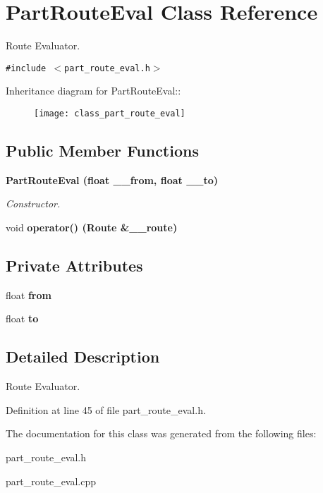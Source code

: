 \section{Part\-Route\-Eval Class Reference}
\label{class_part_route_eval}
Route Evaluator.  


{\tt \#include $<$part\_\-route\_\-eval.h$>$}

Inheritance diagram for Part\-Route\-Eval::\begin{figure}[H]
\begin{center}
\leavevmode
\texttt{[image: class\_part\_route\_eval]}
\end{center}
\end{figure}
\subsection*{Public Member Functions}
\begin{CompactItemize}
\item 
\bf{Part\-Route\-Eval} (float \_\-\_\-from, float \_\-\_\-to)\label{class_part_route_eval_a331566b29bc3227f377004232f05491}

\begin{CompactList}\small\item\em Constructor. \item\end{CompactList}\item 
void \bf{operator()} (\bf{Route} \&\_\-\_\-route)\label{class_part_route_eval_965fab875fb601f17934a6ece761beae}

\end{CompactItemize}
\subsection*{Private Attributes}
\begin{CompactItemize}
\item 
float \bf{from}\label{class_part_route_eval_5bde722e66378b2570ae6c4b4f8df58e}

\item 
float \bf{to}\label{class_part_route_eval_de53cc919faa498663f327b72c357da3}

\end{CompactItemize}


\subsection{Detailed Description}
Route Evaluator. 



Definition at line 45 of file part\_\-route\_\-eval.h.

The documentation for this class was generated from the following files:\begin{CompactItemize}
\item 
part\_\-route\_\-eval.h\item 
part\_\-route\_\-eval.cpp\end{CompactItemize}
